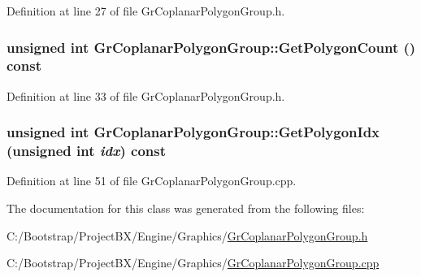 Definition at line 27 of file GrCoplanarPolygonGroup.h.\hypertarget{class_gr_coplanar_polygon_group_8ef726fc062a4f38f21f7880f61c40ef}{
\subsubsection[{GetPolygonCount}]{\setlength{\rightskip}{0pt plus 5cm}unsigned int GrCoplanarPolygonGroup::GetPolygonCount () const}}
\label{class_gr_coplanar_polygon_group_8ef726fc062a4f38f21f7880f61c40ef}




Definition at line 33 of file GrCoplanarPolygonGroup.h.\hypertarget{class_gr_coplanar_polygon_group_50a375daa58de0f2c8ac85be8b005bd0}{
\subsubsection[{GetPolygonIdx}]{\setlength{\rightskip}{0pt plus 5cm}unsigned int GrCoplanarPolygonGroup::GetPolygonIdx (unsigned int {\em idx}) const}}
\label{class_gr_coplanar_polygon_group_50a375daa58de0f2c8ac85be8b005bd0}




Definition at line 51 of file GrCoplanarPolygonGroup.cpp.

The documentation for this class was generated from the following files:\begin{CompactItemize}
\item 
C:/Bootstrap/ProjectBX/Engine/Graphics/\hyperlink{_gr_coplanar_polygon_group_8h}{GrCoplanarPolygonGroup.h}\item 
C:/Bootstrap/ProjectBX/Engine/Graphics/\hyperlink{_gr_coplanar_polygon_group_8cpp}{GrCoplanarPolygonGroup.cpp}\end{CompactItemize}
